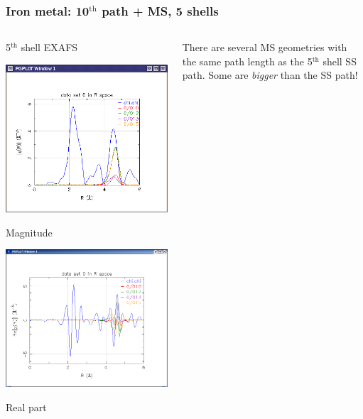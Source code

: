 \begin{frame}
  \frametitle{Iron metal: 10$^{\mathrm{th}}$ path + MS, 5 shells}
  \begin{columns}[T]
    \begin{column}{0.38\linewidth}
      \begin{center}
        5$^{\mathrm{th}}$ shell EXAFS

        \medskip

        \includegraphics[width=0.8\linewidth]{images/path10}

        Magnitude

        \bigskip

        \includegraphics[width=0.8\linewidth]{images/path10_re}

        Real part
      \end{center}
    \end{column}
    \begin{column}{0.62\linewidth}
      There are several MS geometries with the same path length as the
      5$^{\mathrm{th}}$ shell SS path.  Some are \emph{bigger} than
      the SS path!


\end{column}
\end{columns}
\end{frame}
